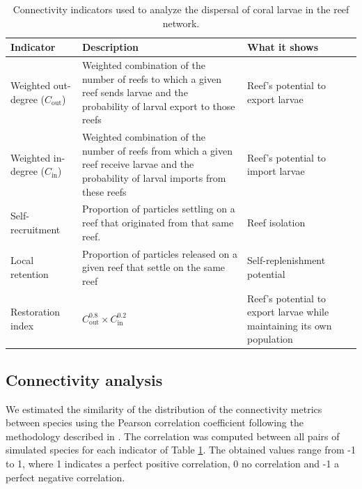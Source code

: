 \documentclass[preprint,12pt,authoryear]{elsarticle}
\begin{document}
	\begin{table}
		\begin{adjustwidth}{-1in}{-1in}
			\centering
			\small
			\begin{tabular}{p{}p{}p{}}
				\hline
				\textbf{Indicator} & \textbf{Description} & \textbf{What it shows} \\
				\hline
				Weighted out-degree ($C_\text{out}$) & Weighted combination of the number of reefs to which a given reef sends larvae and the probability of larval export to those reefs & Reef's potential to export larvae \\
				Weighted in-degree ($C_\text{in}$) & Weighted combination of the number of reefs from which a given reef receive larvae and the probability of larval imports from these reefs & Reef's potential to import larvae \\
				Self-recruitment & Proportion of particles settling on a reef that originated from that same reef. & Reef isolation \\
				Local retention & Proportion of particles released on a given reef that settle on the same reef & Self-replenishment potential \\
				Restoration index & $C_\text{out}^{0.8} \times C_\text{in}^{0.2}$ & Reef's potential to export larvae while maintaining its own population \\
				\hline
			\end{tabular}
		\end{adjustwidth}
		\caption{Connectivity indicators used to analyze the dispersal of coral larvae in the reef network.}\label{tab:indicators}
	\end{table}
	
	\subsection*{Connectivity analysis}
	
	We estimated the similarity of the distribution of the connectivity metrics between species using the Pearson correlation coefficient following the methodology described in \cite{boccaletti2014structure}. The correlation was computed between all pairs of simulated species for each indicator of Table \ref{tab:indicators}. The obtained values range from -1 to 1, where 1 indicates a perfect positive correlation, 0 no correlation and -1 a perfect negative correlation.
	
\end{document}
